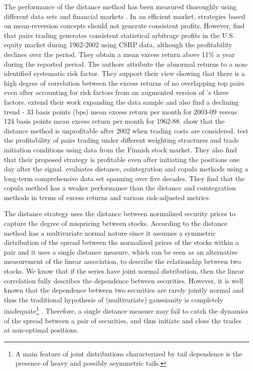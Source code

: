 \documentclass[a4paper]{article}
\begin{document}
	The performance of the distance method has been measured thoroughly using different data sets and financial markets \citep{ggr06,p09,df10,df12,bv12,cm13,rf15}. In an efficient market, strategies based on mean-reversion concepts should not generate consistent profits. However, \citet*{ggr06} find that pairs trading generates consistent statistical arbitrage profits in the U.S. equity market during 1962-2002 using CSRP data, although the profitability declines over the period. They obtain a mean excess return above 11\% a year during the reported period. The authors attribute the abnormal returns to a non-identified systematic risk factor. They support their view showing that there is a high degree of correlation between the excess returns of no overlapping top pairs even after accounting for risk factors from an augmented version of \citet*{ff93}'s three factors. \citet*{df10} extend their work expanding the data sample and also find a declining trend - 33 basis points (bps) mean excess return per month for 2003-09 versus 124 basis points mean excess return per month for 1962-88. \citet*{df12} show that the distance method is unprofitable after 2002 when trading costs are considered. \citet*{bv12} test the profitability of pairs trading under different weighting structures and trade initiation conditions using data from the Finnish stock market. They also find that their proposed strategy is profitable even after initiating the positions one day after the signal. \citet*{rf15} evaluates distance, cointegration and copula methods using a long-term comprehensive data set spanning over five decades. They find that the copula method has a weaker performance than the distance and cointegration methods in terms of excess returns and various risk-adjusted metrics.
	
The distance strategy \citep{ggr06} uses the distance between normalized security prices to capture the degree of mispricing between stocks. According to \citet*{xie14} the distance method has a multivariate normal nature since it assumes a symmetric distribution of the spread between the normalized prices of the stocks within a pair and it uses a single distance measure, which can be seen as an alternative measurement of the linear association, to describe the relationship between two stocks. We know that if the series have joint normal distribution, then the linear correlation fully describes the dependence between securities. However, it is well known that the dependence between two securities are rarely jointly normal and thus the traditional hypothesis of (multivariate) gaussianity is completely inadequate\footnote{A main feature of joint distributions characterized by tail dependence is the presence of heavy and possibly asymmetric tails.} \citep{campbell97,cont01,ane03,mcneil15}.  Therefore, a single distance measure may fail to catch the dynamics of the spread between a pair of securities, and thus initiate and close the trades at non-optimal positions.
	
\end{document}
